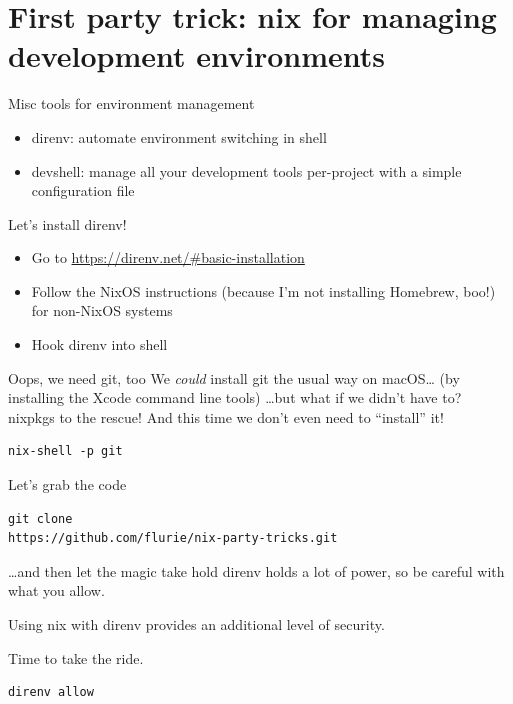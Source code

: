 \documentclass[bigger]{beamer}
\begin{document}
\section{First party trick: nix for managing development environments}
\label{sec:org872305d}
\begin{frame}[label={sec:orge86b34f}]{Misc tools for environment management}
\begin{itemize}
\item direnv: automate environment switching in shell
\item devshell: manage all your development tools per-project with a simple configuration file
\end{itemize}
\end{frame}
\begin{frame}[label={sec:org9acb822}]{Let's install direnv!}
\begin{itemize}
\item Go to \url{https://direnv.net/\#basic-installation}
\item Follow the NixOS instructions (because I'm not installing Homebrew, boo!) for non-NixOS systems
\item Hook direnv into shell
\end{itemize}
\end{frame}
\begin{frame}[label={sec:org7437e7e},fragile]{Oops, we need git, too}
 We \emph{could} install git the usual way on macOS\ldots{}
(by installing the Xcode command line tools)
\ldots{}but what if we didn't have to?
nixpkgs to the rescue! And this time we don't even need to ``install'' it!
\begin{verbatim}
nix-shell -p git
\end{verbatim}
\end{frame}
\begin{frame}[label={sec:orgda8335c},fragile]{Let's grab the code}
 \begin{verbatim}
git clone
https://github.com/flurie/nix-party-tricks.git
\end{verbatim}
\end{frame}
\begin{frame}[label={sec:org4c593f7},fragile]{\ldots{}and then let the magic take hold}
 direnv holds a \alert{lot} of power, so be careful with what you allow.

Using nix with direnv provides an additional level of security.

Time to take the ride.

\begin{verbatim}
direnv allow
\end{verbatim}
\end{frame}
\end{document}
